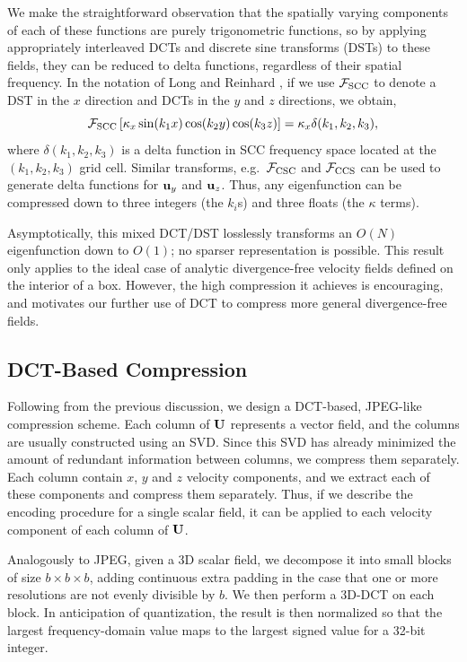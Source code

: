 We make the straightforward observation that the spatially varying components of each of these functions are purely trigonometric functions, so by applying appropriately interleaved DCTs and discrete sine transforms (DSTs) to these fields, they can be reduced to delta functions, regardless of their spatial frequency. In the notation of Long and Reinhard \cite{long2009}, if we use $\mathcal{F}_\textrm{SCC}$ to denote a DST in the $x$ direction and DCTs in the $y$ and $z$ directions, we obtain,
\begin{equation}
\mathcal{F}_\textrm{SCC}\left[\kappa_x\sin(k_1 x) \cos(k_2 y) \cos(k_3 z)\right] = \kappa_x\delta(k_1, k_2, k_3),
\end{equation}
where $\delta(k_1, k_2, k_3)$ is a delta function in SCC frequency space located at the $(k_1, k_2, k_3)$ grid cell. Similar transforms, e.g.~$\mathcal{F}_\textrm{CSC}$ and $\mathcal{F}_\textrm{CCS}$ can be used to generate delta functions for $\mathbf{u}_y$ and $\mathbf{u}_z$. Thus, any eigenfunction can be compressed down to three integers (the $k_i$s) and three floats (the $\kappa$ terms).

Asymptotically, this mixed DCT/DST losslessly transforms an $O(N)$ eigenfunction down to $O(1)$; no sparser representation is possible. This result only applies to the ideal case of analytic divergence-free velocity fields defined on the interior of a box. However, the high compression it achieves is encouraging, and motivates our further use of DCT to compress more general divergence-free fields.

\subsection{DCT-Based Compression}

Following from the previous discussion, we design a DCT-based, JPEG-like compression scheme. Each column of $\mathbf{U}$ represents a vector field, and the columns are usually constructed using an SVD. Since this SVD has already minimized the amount of redundant information between columns, we compress them separately. Each column contain $x$, $y$ and $z$ velocity components, and we extract each of these components and compress them separately. Thus, if we describe the encoding procedure for a single scalar field, it can be applied to each velocity component of each column of $\mathbf{U}$.

Analogously to JPEG, given a 3D scalar field, we decompose it into small blocks of size $b \times b \times b$, adding continuous extra padding in the case that one or more resolutions are not evenly divisible by $b$. We then perform a 3D-DCT on each block. In anticipation of quantization, the result is then normalized so that the largest frequency-domain value maps to the largest signed value for a 32-bit integer.

